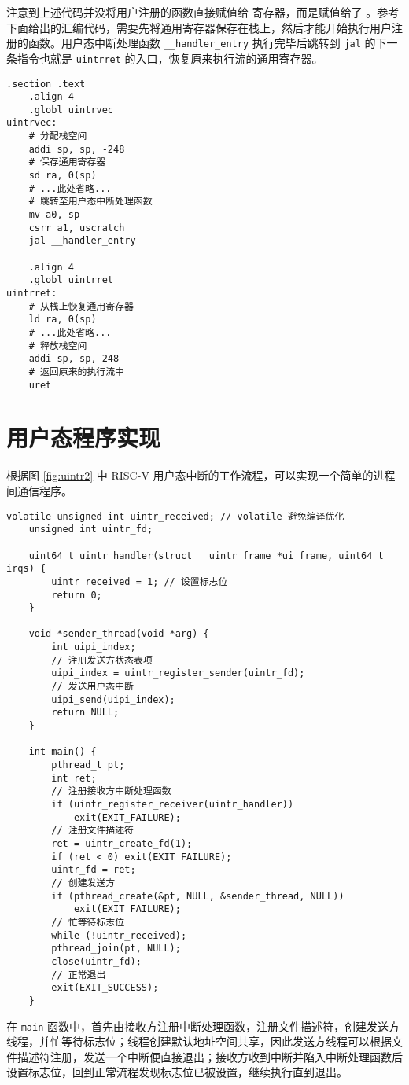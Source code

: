注意到上述代码并没将用户注册的函数直接赋值给 \Rutvec 寄存器，而是赋值给了 \Ruscratch 。参考下面给出的汇编代码，需要先将通用寄存器保存在栈上，然后才能开始执行用户注册的函数。用户态中断处理函数 \texttt{\_\_handler\_entry} 执行完毕后跳转到 \texttt{jal} 的下一条指令也就是 \texttt{uintrret} 的入口，恢复原来执行流的通用寄存器。

\begin{lstlisting}[style=ASMStyle]
    .section .text
    .align 4
    .globl uintrvec
uintrvec:
    # 分配栈空间
    addi sp, sp, -248
    # 保存通用寄存器
    sd ra, 0(sp)
    # ...此处省略...
    # 跳转至用户态中断处理函数
    mv a0, sp
    csrr a1, uscratch
    jal __handler_entry

    .align 4
    .globl uintrret
uintrret:
    # 从栈上恢复通用寄存器
    ld ra, 0(sp)
    # ...此处省略...
    # 释放栈空间
    addi sp, sp, 248
    # 返回原来的执行流中
    uret
\end{lstlisting}

\section{用户态程序实现}

根据图 \ref{fig:uintr2} 中 RISC-V 用户态中断的工作流程，可以实现一个简单的进程间通信程序。

\begin{lstlisting}[style=CStyle]
    volatile unsigned int uintr_received; // volatile 避免编译优化
    unsigned int uintr_fd;

    uint64_t uintr_handler(struct __uintr_frame *ui_frame, uint64_t irqs) {
        uintr_received = 1; // 设置标志位
        return 0;
    }

    void *sender_thread(void *arg) {
        int uipi_index;
        // 注册发送方状态表项
        uipi_index = uintr_register_sender(uintr_fd);
        // 发送用户态中断
        uipi_send(uipi_index);
        return NULL;
    }

    int main() {
        pthread_t pt;
        int ret;
        // 注册接收方中断处理函数
        if (uintr_register_receiver(uintr_handler))
            exit(EXIT_FAILURE);
        // 注册文件描述符
        ret = uintr_create_fd(1);
        if (ret < 0) exit(EXIT_FAILURE);
        uintr_fd = ret;
        // 创建发送方
        if (pthread_create(&pt, NULL, &sender_thread, NULL))
            exit(EXIT_FAILURE);
        // 忙等待标志位
        while (!uintr_received);
        pthread_join(pt, NULL);
        close(uintr_fd);
        // 正常退出
        exit(EXIT_SUCCESS);
    }
\end{lstlisting}

在 \texttt{main} 函数中，首先由接收方注册中断处理函数，注册文件描述符，创建发送方线程，并忙等待标志位；线程创建默认地址空间共享，因此发送方线程可以根据文件描述符注册，发送一个中断便直接退出；接收方收到中断并陷入中断处理函数后设置标志位，回到正常流程发现标志位已被设置，继续执行直到退出。

